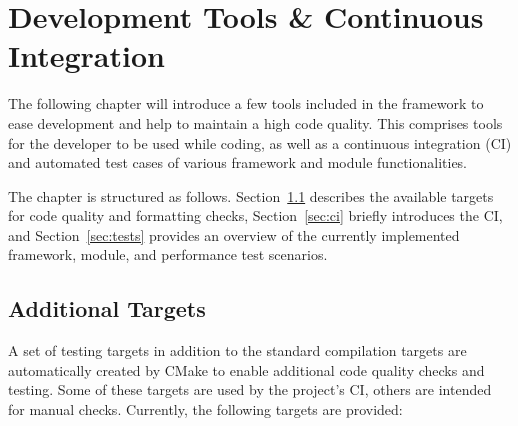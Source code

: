 \chapter{Development Tools \& Continuous Integration}
\label{ch:testing}

The following chapter will introduce a few tools included in the framework to ease development and help to maintain a high code quality. This comprises tools for the developer to be used while coding, as well as a continuous integration (CI) and automated test cases of various framework and module functionalities.

The chapter is structured as follows.
Section~\ref{sec:targets} describes the available  targets for code quality and formatting checks, Section~\ref{sec:ci} briefly introduces the CI, and Section~\ref{sec:tests} provides an overview of the currently implemented framework, module, and performance test scenarios.

\section{Additional Targets}
\label{sec:targets}

A set of testing targets in addition to the standard compilation targets are automatically created by CMake to enable additional code quality checks and testing.
Some of these targets are used by the project's CI, others are intended for manual checks.
Currently, the following targets are provided:

